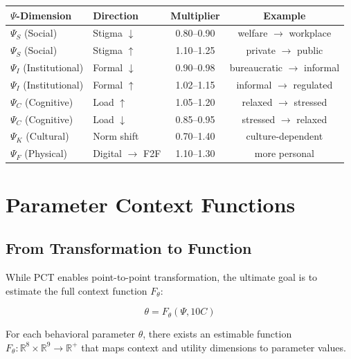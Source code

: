 \begin{center}
\begin{tabular}{llcc}
\toprule
\textbf{$\Psi$-Dimension} & \textbf{Direction} & \textbf{Multiplier} & \textbf{Example} \\
\midrule
$\Psi_S$ (Social) & Stigma $\downarrow$ & 0.80--0.90 & welfare $\to$ workplace \\
$\Psi_S$ (Social) & Stigma $\uparrow$ & 1.10--1.25 & private $\to$ public \\
$\Psi_I$ (Institutional) & Formal $\downarrow$ & 0.90--0.98 & bureaucratic $\to$ informal \\
$\Psi_I$ (Institutional) & Formal $\uparrow$ & 1.02--1.15 & informal $\to$ regulated \\
$\Psi_C$ (Cognitive) & Load $\uparrow$ & 1.05--1.20 & relaxed $\to$ stressed \\
$\Psi_C$ (Cognitive) & Load $\downarrow$ & 0.85--0.95 & stressed $\to$ relaxed \\
$\Psi_K$ (Cultural) & Norm shift & 0.70--1.40 & culture-dependent \\
$\Psi_F$ (Physical) & Digital $\to$ F2F & 1.10--1.30 & more personal \\
\bottomrule
\end{tabular}
\end{center}



\section{Parameter Context Functions}
\label{sec:pct-functions}

\subsection{From Transformation to Function}

While PCT enables point-to-point transformation, the ultimate goal is to estimate
the full context function $F_\theta$:

\begin{equation}
\theta = F_\theta(\Psi, 10C)
\label{eq:context-function}
\end{equation}

\begin{axiom}
\label{ax:pct-3}
For each behavioral parameter $\theta$, there exists an estimable function
$F_\theta: \mathbb{R}^{8} \times \mathbb{R}^{9} \to \mathbb{R}^+$ that maps
context and utility dimensions to parameter values.
\end{axiom}

